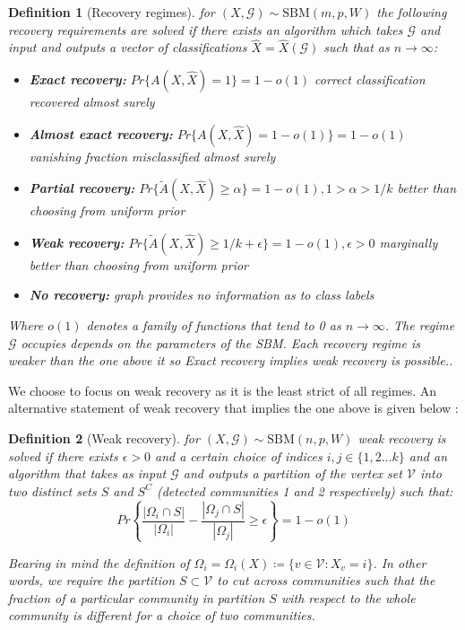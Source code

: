 \documentclass[]{article}
\newcommand{\Gcal}{\mathcal{G}}
\newcommand{\Vcal}{\mathcal{V}}
\newtheorem{definition}{Definition}[section]
\begin{document}
\begin{multicols*}{2}
\begin{definition}[Recovery regimes]
	for $(X, \Gcal) \sim \textrm{SBM}(m, p, W)$ the following recovery requirements are solved if there exists an algorithm which takes $\Gcal$ and input and outputs a vector of classifications $\hat{X} = \hat{X}(\Gcal)$ such that as $n \rightarrow \infty$:
	\begin{itemize}
		\item \textbf{Exact recovery:} $Pr\{A(X, \hat{X}) = 1\} = 1 - o(1)$ correct classification recovered almost surely
		\item \textbf{Almost exact recovery:} $Pr\{A(X, \hat{X}) = 1 - o(1)\} = 1 - o(1)$ vanishing fraction misclassified almost surely
		\item \textbf{Partial recovery:} $Pr\{\tilde{A}(X, \hat{X}) \geq \alpha\} = 1 - o(1), 1 > \alpha > 1/k$ better than choosing from uniform prior
		\item \textbf{Weak recovery:} $Pr\{\tilde{A}(X, \hat{X}) \geq 1/k + \epsilon \} = 1 - o(1), \epsilon > 0$ marginally better than choosing from uniform prior
		\item \textbf{No recovery:} graph provides no information as to class labels
	\end{itemize}
	Where $o(1)$ denotes a family of functions that tend to 0 as $n \rightarrow \infty$. The regime $\Gcal$ occupies depends on the parameters of the SBM. Each recovery regime is weaker than the one above it so Exact recovery implies weak recovery is possible..
\end{definition}

We choose to focus on weak recovery as it is the least strict of all regimes. An alternative statement of weak recovery that implies the one above is given below \cite{Abbe}:

\begin{definition}[Weak recovery]
	\label{defn:weak-recovery}
	for  $(X, \Gcal) \sim \textrm{SBM}(n, p, W)$ weak recovery is solved if there exists $\epsilon > 0$ and a certain choice of indices $i, j \in \{1, 2 \dots k\}$ and an algorithm that takes as input $\Gcal$ and outputs a partition of the vertex set $\Vcal$ into two distinct sets $S$ and $S^C$ (detected communities 1 and 2 respectively) such that:
	\begin{equation*}
		Pr\left\{ \frac{|\Omega_i \cap S|}{|\Omega_i|} - \frac{|\Omega_j \cap S|}{|\Omega_j|} \geq \epsilon \right\} = 1 - o(1)
	\end{equation*}

	Bearing in mind the definition of $\Omega_i = \Omega_i(X) \coloneqq \{v \in \Vcal : X_v = i\}$. In other words, we require the partition $S \subset \Vcal$ to cut across communities such that the fraction of a particular community in partition $S$ with respect to the whole community is different for a choice of two communities.  
\end{definition}



\end{multicols*}
\end{document}
